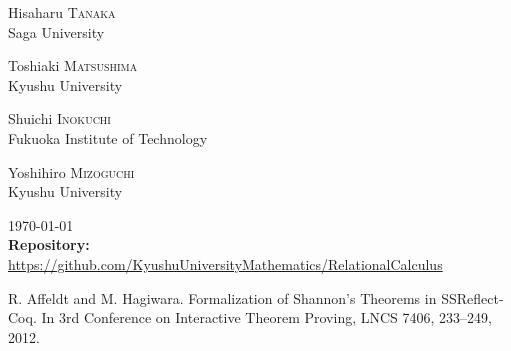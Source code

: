 \documentclass[12pt]{report}
\begin{document}
\begin{titlepage}
\begin{center}
\begin{center}
\begin{minipage}[t]{0.4\textwidth}
\begin{center} 
{\large Hisaharu \textsc{Tanaka}} \\
Saga University
\end{center}
\end{minipage}
\hspace{1cm}
\begin{minipage}[t]{0.4\textwidth}
\begin{center} 
{\large Toshiaki \textsc{Matsushima}} \\
Kyushu University
\end{center}
\end{minipage}
\end{center}
\begin{center}
\begin{minipage}[t]{0.4\textwidth}
\begin{center}
{\large Shuichi \textsc{Inokuchi}} \\
Fukuoka Institute of Technology
\end{center}
\end{minipage}
\hspace{1cm}
\begin{minipage}[t]{0.4\textwidth}
\begin{center} 
{\large Yoshihiro \textsc{Mizoguchi}} \\
Kyushu University
\end{center}
\end{minipage}
\end{center}
\vfill

{\large \today}\\[1cm]
{\footnotesize
{\bf Repository:\ }
\url{https://github.com/KyushuUniversityMathematics/RelationalCalculus}}
\end{center}
\end{titlepage}

\tableofcontents

\setlength{\headheight}{15pt}
\pagestyle{fancy}
\fancyhead{}
\fancyhead[RE]{\rightmark}
\fancyhead[LO]{\leftmark}
















\begin{thebibliography}{99}
R. Affeldt and M. Hagiwara. Formalization of Shannon’s Theorems in SSReflect-Coq. In 3rd Conference on Interactive Theorem Proving, LNCS 7406, 233--249, 2012.
\end{thebibliography}
\end{document}
